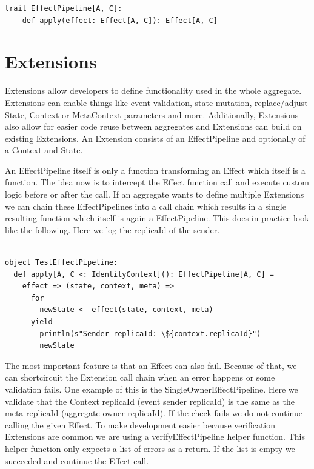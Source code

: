 \documentclass[
	ngerman,
	ruledheaders=section,   %
	class=report,		    %
	thesis={type=bachelor}, %
	accentcolor=9c,			%
	custommargins=true,    %
	marginpar=false,        %
	parskip=half-,          %
	fontsize=11pt,          %
]{tudapub}
\begin{document}
\begin{lstlisting}
trait EffectPipeline[A, C]:
	def apply(effect: Effect[A, C]): Effect[A, C]
\end{lstlisting}

\section{Extensions}
Extensions allow developers to define functionality used in the whole aggregate. Extensions can enable things like event validation, state mutation, replace/adjust State, Context or MetaContext parameters and more. Additionally, Extensions also allow for easier code reuse between aggregates and Extensions can build on existing Extensions. An Extension consists of an EffectPipeline and optionally of a Context and State. 

An EffectPipeline itself is only a function transforming an Effect which itself is a function. The idea now is to intercept the Effect function call and execute custom logic before or after the call. If an aggregate wants to define multiple Extensions we can chain these EffectPipelines into a call chain which results in a single resulting function which itself is again a EffectPipeline. This does in practice look like the following. Here we log the replicaId of the sender.

\begin{lstlisting}

object TestEffectPipeline:
  def apply[A, C <: IdentityContext](): EffectPipeline[A, C] =
    effect => (state, context, meta) => 
      for
        newState <- effect(state, context, meta)
      yield
        println(s"Sender replicaId: \${context.replicaId}")
        newState

\end{lstlisting}

The most important feature is that an Effect can also fail. Because of that, we can shortcircuit the Extension call chain when an error happens or some validation fails. One example of this is the SingleOwnerEffectPipeline. Here we validate that the Context replicaId (event sender replicaId) is the same as the meta replicaId (aggregate owner replicaId). If the check fails we do not continue calling the given Effect. To make development easier because verification Extensions are common we are using a verifyEffectPipeline helper function. This helper function only expects a list of errors as a return. If the list is empty we succeeded and continue the Effect call.
\end{document}
